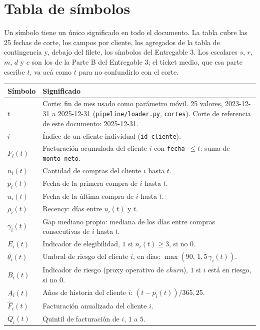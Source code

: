 \documentclass[11pt,a4paper]{article}
\begin{document}
\vspace{2mm}
\tableofcontents

\newpage
\section{Tabla de símbolos}

Un símbolo tiene un único significado en todo el documento. La tabla cubre las 25 fechas de corte, los campos por cliente, los agregados de la tabla de contingencia y, debajo del filete, los símbolos del Entregable 3. Los escalares $s$, $r$, $m$, $d$ y $c$ son los de la Parte B del Entregable 3; el ticket medio, que esa parte escribe $t$, va acá como $\bar t$ para no confundirlo con el corte.

\begin{longtable}{@{}l p{10.7cm}@{}}
\toprule
Símbolo & Significado \\
\midrule
\endhead
$t$ & Corte: fin de mes usado como parámetro móvil. 25 valores, 2023-12-31 a 2025-12-31 (\texttt{pipeline/loader.py}, \texttt{cortes}). Corte de referencia de este documento: 2025-12-31. \\
$i$ & Índice de un cliente individual (\texttt{id\_cliente}). \\
$F_i(t)$ & Facturación acumulada del cliente $i$ con \texttt{fecha}~$\le t$: suma de \texttt{monto\_neto}. \\
$n_i(t)$ & Cantidad de compras del cliente $i$ hasta $t$. \\
$p_i(t)$ & Fecha de la primera compra de $i$ hasta $t$. \\
$u_i(t)$ & Fecha de la última compra de $i$ hasta $t$. \\
$\rho_i(t)$ & Recency: días entre $u_i(t)$ y $t$. \\
$\gamma_i(t)$ & Gap mediano propio: mediana de los días entre compras consecutivas de $i$ hasta $t$. \\
$E_i(t)$ & Indicador de elegibilidad, $1$ si $n_i(t)\ge 3$, si no $0$. \\
$\theta_i(t)$ & Umbral de riesgo del cliente $i$, en días: $\max(90,\,1{,}5\,\gamma_i(t))$. \\
$B_i(t)$ & Indicador de riesgo (proxy operativo de \emph{churn}), $1$ si $i$ está en riesgo, si no $0$. \\
$A_i(t)$ & Años de historia del cliente $i$: $(t - p_i(t))/365{,}25$. \\
$\hat F_i(t)$ & Facturación anualizada del cliente $i$. \\
$Q_i(t)$ & Quintil de facturación de $i$, $1$ a $5$. \\

\end{longtable}
\end{document}
